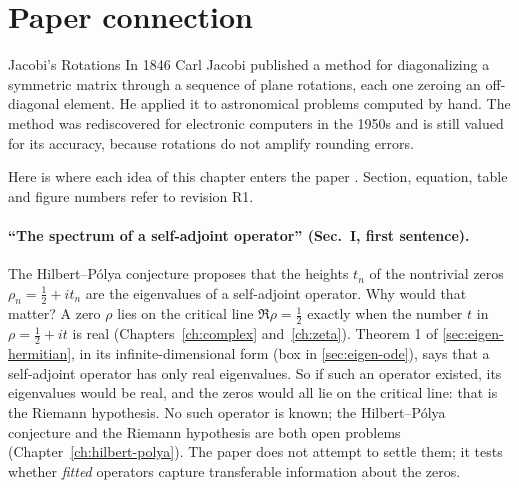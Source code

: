 \section{Paper connection}\label{sec:eigen-paper}
\begin{didyouknow}{Jacobi's Rotations}
In 1846 Carl Jacobi published a method for diagonalizing a symmetric matrix through a sequence of plane rotations, each one zeroing an off-diagonal element. He applied it to astronomical problems computed by hand. The method was rediscovered for electronic computers in the 1950s and is still valued for its accuracy, because rotations do not amplify rounding errors.
\end{didyouknow}

Here is where each idea of this chapter enters the paper \cite{soniR1}. Section, equation, table and figure numbers refer to revision R1.

\paragraph{``The spectrum of a self-adjoint operator'' (Sec.~I, first sentence).} The Hilbert--P\'olya conjecture proposes that the heights $t_n$ of the nontrivial zeros $\rho_n=\tfrac12+it_n$ are the eigenvalues of a self-adjoint operator. Why would that matter? A zero $\rho$ lies on the critical line $\Re\rho=\tfrac12$ exactly when the number $t$ in $\rho=\tfrac12+it$ is real (Chapters~\ref{ch:complex} and~\ref{ch:zeta}). Theorem 1 of \cref{sec:eigen-hermitian}, in its infinite-dimensional form (box in \cref{sec:eigen-ode}), says that a self-adjoint operator has only real eigenvalues. So if such an operator existed, its eigenvalues would be real, and the zeros would all lie on the critical line: that is the Riemann hypothesis. No such operator is known; the Hilbert--P\'olya conjecture and the Riemann hypothesis are both open problems (Chapter~\ref{ch:hilbert-polya}). The paper does not attempt to settle them; it tests whether \emph{fitted} operators capture transferable information about the zeros.

